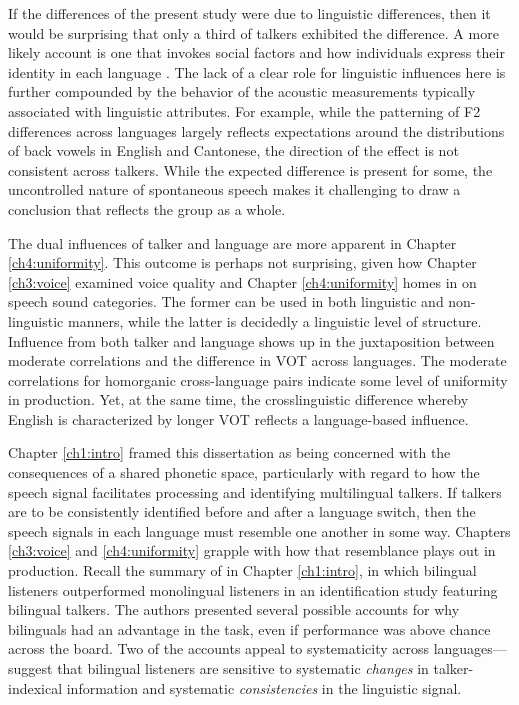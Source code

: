 If the differences of the present study were due to linguistic differences, then it would be surprising that only a third of talkers exhibited the difference. A more likely account is one that invokes social factors and how individuals express their identity in each language \citep{loveday_1981_pitch, voigt_2016_between}. The lack of a clear role for linguistic influences here is further compounded by the behavior of the acoustic measurements typically associated with linguistic attributes. For example, while the patterning of F2 differences across languages largely reflects expectations around the distributions of back vowels in English and Cantonese, the direction of the effect is not consistent across talkers. While the expected difference is present for some, the uncontrolled nature of spontaneous speech makes it challenging to draw a conclusion that reflects the group as a whole.

The dual influences of talker and language are more apparent in Chapter \ref{ch4:uniformity}. This outcome is perhaps not surprising, given how Chapter \ref{ch3:voice} examined voice quality and Chapter \ref{ch4:uniformity} homes in on speech sound categories. The former can be used in both linguistic and non-linguistic manners, while the latter is decidedly a linguistic level of structure. Influence from both talker and language shows up in the juxtaposition between moderate correlations and the difference in VOT across languages. The moderate correlations for homorganic cross-language pairs indicate some level of uniformity in production. Yet, at the same time, the crosslinguistic difference whereby English is characterized by longer VOT reflects a language-based influence. 

Chapter \ref{ch1:intro} framed this dissertation as being concerned with the consequences of a shared phonetic space, particularly with regard to how the speech signal facilitates processing and identifying multilingual talkers. If talkers are to be consistently identified before and after a language switch, then the speech signals in each language must resemble one another in some way. Chapters \ref{ch3:voice} and \ref{ch4:uniformity} grapple with how that resemblance plays out in production. Recall the summary of \citet{orena_2019_identifying} in Chapter \ref{ch1:intro}, in which bilingual listeners outperformed monolingual listeners in an identification study featuring bilingual talkers. The authors presented several possible accounts for why bilinguals had an advantage in the task, even if performance was above chance across the board. Two of the accounts appeal to systematicity across languages---\citet{orena_2019_identifying} suggest that bilingual listeners are sensitive to systematic \textit{changes} in talker-indexical information and systematic \textit{consistencies} in the linguistic signal. 

